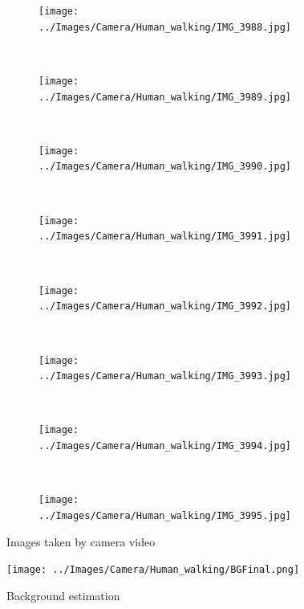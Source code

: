 \begin{figure}[h!]
\centering
\begin{subfigure}{0.19\textwidth}
\texttt{[image: ../Images/Camera/Human\_walking/IMG\_3988.jpg]}
\caption{}
\label{fig:Bib1}
\end{subfigure}
~
\begin{subfigure}{0.19\textwidth}
\texttt{[image: ../Images/Camera/Human\_walking/IMG\_3989.jpg]}
\caption{}
\label{fig:Bib2}
\end{subfigure}
~
\begin{subfigure}{0.19\textwidth}
\texttt{[image: ../Images/Camera/Human\_walking/IMG\_3990.jpg]}
\caption{}
\label{fig:Bib3}
\end{subfigure}
~
\begin{subfigure}{0.19\textwidth}
\texttt{[image: ../Images/Camera/Human\_walking/IMG\_3991.jpg]}
\caption{}
\label{fig:Bib4}
\end{subfigure}
~
\begin{subfigure}{0.19\textwidth}
\texttt{[image: ../Images/Camera/Human\_walking/IMG\_3992.jpg]}
\caption{}
\label{fig:Bib5}
\end{subfigure}
~
\begin{subfigure}{0.19\textwidth}
\texttt{[image: ../Images/Camera/Human\_walking/IMG\_3993.jpg]}
\caption{}
\label{fig:Bib6}
\end{subfigure}
~
\begin{subfigure}{0.19\textwidth}
\texttt{[image: ../Images/Camera/Human\_walking/IMG\_3994.jpg]}
\caption{}
\label{fig:Bib7}
\end{subfigure}
~
\begin{subfigure}{0.19\textwidth}
\texttt{[image: ../Images/Camera/Human\_walking/IMG\_3995.jpg]}
\caption{}
\label{fig:Bib8}
\end{subfigure}
\caption{Images taken by camera video}
\label{fig:AllBib}
\end{figure}

\begin{figure}[h]
\centering
\texttt{[image: ../Images/Camera/Human\_walking/BGFinal.png]}
\label{fig:BibBG}
\caption{Background estimation}
\end{figure} 
